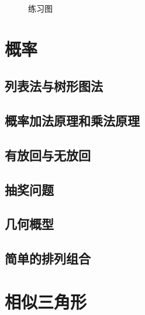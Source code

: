 \begin{figure}[H]
    \centering
    \resizebox{4cm}{!}{}
    \caption{练习图}
\end{figure}
\clearpage
\chapter{概率}
\section{列表法与树形图法}
\clearpage
\section{概率加法原理和乘法原理}
\clearpage
\section{有放回与无放回}
\clearpage
\section{抽奖问题}
\clearpage
\section{几何概型}
\clearpage
\section{简单的排列组合}
\clearpage
\chapter{相似三角形}
